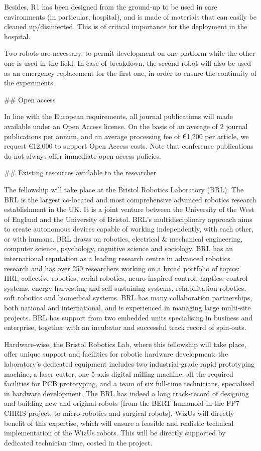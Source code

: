 \documentclass[11pt,a4paper]{report}
\begin{document}
Besides, R1 has been designed from the ground-up to be used in care environments (in particular, hospital), and 
is made of materials that can easily be cleaned up/disinfected. This is of critical importance for the deployment 
in the hospital.

Two robots are necessary, to permit development on one platform while the other one is used in the field. In case 
of breakdown, the second robot will also be used as an emergency replacement for the first one, in order to ensure
the continuity of the experiments.

## Open access

In line with the European requirements, all journal publications will made available under an Open Access license.
On the basis of an average of 2 journal publications per annum, and an average processing fee of €1,200 per
article, we request €12,000 to support Open Access costs. Note that conference publications do not always offer
immediate open-access policies.

## Existing resources available to the researcher

The fellowship will take place at the Bristol Robotics Laboratory (BRL). The BRL is the largest co-located and most
comprehensive advanced robotics research establishment in the UK. It is a joint venture between the University
of the West of England and the University of Bristol. BRL’s multidisciplinary approach aims to create autonomous
devices capable of working independently, with each other, or with humans. BRL draws on robotics, electrical &
mechanical engineering, computer science, psychology, cognitive science and sociology. BRL has an international
reputation as a leading research centre in advanced robotics research and has over 250 researchers working on
a broad portfolio of topics: HRI, collective robotics, aerial robotics, neuro-inspired control, haptics, control systems, 
energy harvesting and self-sustaining systems, rehabilitation robotics, soft robotics and biomedical systems. 
BRL has many collaboration partnerships, both national and international, and is experienced in managing
large multi-site projects. BRL has support from two embedded units specialising in business and enterprise, together
 with an incubator and successful track record of spin-outs.

Hardware-wise, the Bristol Robotics Lab, where this fellowship will take place, offer unique support and facilities
 for robotic hardware development: the laboratory’s dedicated equipment includes two industrial-grade
rapid prototyping machine, a laser cutter, one 5-axis digital milling machine, all the required facilities for PCB
prototyping, and a team of six full-time technicians, specialised in hardware development. The BRL has indeed a
long track-record of designing and building new and original robots (from the BERT humanoid in the FP7 CHRIS
project, to micro-robotics and surgical robots). WizUs will directly benefit of this expertise, which will ensure a feasible
and realistic technical implementation of the WizUs robots. This will be directly supported by dedicated technician time, 
costed in the project.
\end{document}
